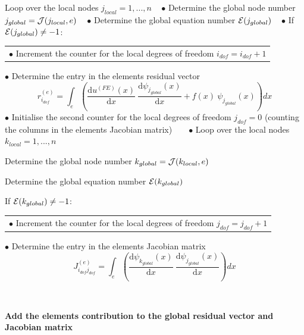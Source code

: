 \begin{DoxyItemize}
\begin{DoxyItemize}
\item Loop over the local nodes $ j_{local}=1,...,n $ ~\newline
 $ \bullet $ Determine the global node number $ j_{global}={\cal J}(j_{local},e)$ ~\newline
 $ \bullet $ Determine the global equation number $ {\cal E}( j_{global}) $ ~\newline
 $ \bullet $ If $ {\cal E}( j_{global}) \ne -1 $\+: \tabulinesep=1mm
\begin{longtabu} spread 0pt [c]{*{1}{|X[-1]}|}
\hline
$ \bullet $ Increment the counter for the local degrees of freedom $ i_{dof}= i_{dof}+1$   \\
\end{longtabu}
$ \bullet $ Determine the entry in the element\textquotesingle{}s residual vector \[ r_{i_{dof}}^{(e)} = \int_{e} \left( \frac{\mbox{d} u^{(FE)}(x)}{\mbox{d} x} \ \frac{\mbox{d} \psi_{j_{global}}(x)}{\mbox{d} x} + f(x) \ \psi_{j_{global}}(x) \right) dx \] $ \bullet $ Initialise the second counter for the local degrees of freedom $ j_{dof}=0$ (counting the columns in the element\textquotesingle{}s Jacobian matrix) ~\newline
~\newline
 $ \bullet $ Loop over the local nodes $ k_{local}=1,...,n $
\begin{DoxyItemize}
\item Determine the global node number $ k_{global}={\cal J}(k_{local},e)$
\item Determine the global equation number $ {\cal E}( k_{global}) $
\item If $ {\cal E}( k_{global}) \ne -1 $\+: \tabulinesep=1mm
\begin{longtabu} spread 0pt [c]{*{1}{|X[-1]}|}
\hline
$ \bullet $ Increment the counter for the local degrees of freedom $ j_{dof}= j_{dof}+1$   \\
\end{longtabu}
$ \bullet $ Determine the entry in the element\textquotesingle{}s Jacobian matrix \[ J_{i_{dof}j_{dof}}^{(e)} = \int_{e} \left( \frac{\mbox{d} \psi_{k_{global}}(x)}{\mbox{d} x} \ \frac{\mbox{d} \psi_{j_{global}}(x)}{\mbox{d} x} \right) dx \]
\end{DoxyItemize}
\end{DoxyItemize}~\newline
 ~\newline
 \begin{center} {\bfseries  Add the element\textquotesingle{}s contribution to the global residual vector and Jacobian matrix } \end{center}  ~\newline


\end{DoxyItemize}

